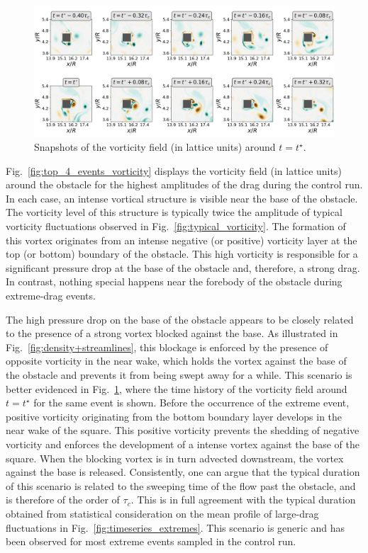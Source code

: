 \documentclass[pre,aps,floatfix,10pt,superscriptaddress, notitlepage,preprint]{revtex4-1}
\begin{document}
\begin{figure}
  \centering
  \includegraphics[width=.8\linewidth]{dynamics_extremes/dynamics_extremes.png}
  \caption{\label{fig:vorticity_dynamics} Snapshots of the vorticity field (in lattice units)  around $t=t^{\star}$.}
\end{figure}
%
Fig.~\ref{fig:top_4_events_vorticity} displays the vorticity field (in lattice units) around the obstacle for the highest amplitudes of the drag during the control run.
%
In each case, an intense vortical structure is visible near the base of the obstacle.
The vorticity level of this structure is typically twice the amplitude of typical vorticity fluctuations observed in Fig.~\ref{fig:typical_vorticity}.
%
The formation of this vortex originates from an intense negative (or positive) vorticity layer at the top (or bottom) boundary of the obstacle. 
%
This high vorticity is responsible for a significant pressure drop at the base of the obstacle and, therefore, a strong drag. In contrast, nothing special happens near the forebody of the obstacle during extreme-drag events.  


The high pressure drop on the base of the obstacle appears to be closely related to the presence of a strong vortex blocked against the base. 
As illustrated in Fig.~\ref{fig:density+streamlines}, this blockage is enforced by the presence of opposite vorticity in the near wake, which holds the vortex against the base of the obstacle and prevents it from being swept away for a while.
% 
This scenario is better evidenced in Fig.~\ref{fig:vorticity_dynamics}, where the time history of the vorticity field around $t=t^\star$ for the same event is shown. 
%
Before the occurrence of the extreme event, positive vorticity originating from the bottom boundary layer develops in the near wake of the square. This positive vorticity  prevents the shedding of negative vorticity and enforces the development of a intense vortex against the base of the square. 
When the blocking vortex is in turn advected downstream, the vortex against the base is released.
%
Consistently, one can argue that the typical duration of this scenario is related to the sweeping time of the flow past the obstacle, and is therefore of the order of $\tau_c$.
This is in full agreement with the typical duration obtained from statistical consideration on the mean profile of large-drag fluctuations in Fig.~\ref{fig:timeseries_extremes}.
This scenario is generic and has been observed for most extreme events sampled in the control run.
\end{document}
